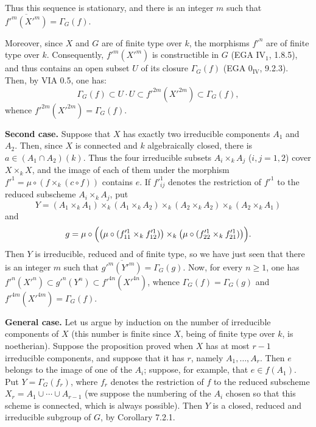 Thus this sequence is stationary, and there is an integer $m$ such that $\overline{f'^m(X'^m)}=\Gamma_G(f)$.

Moreover, since $X$ and $G$ are of finite type over $k$, the morphisms $f'^n$ are of finite type over $k$. Consequently, $f'^m(X'^m)$ is constructible in $G$ (EGA IV$_1$, 1.8.5), and thus contains an open subset $U$ of its closure $\Gamma_G(f)$ (EGA 0$_{\mathrm{IV}}$, 9.2.3). Then, by VIA 0.5, one has:
\[
\Gamma_G(f)\subset U\cdot U\subset f'^{2m}(X'^{2m})\subset\Gamma_G(f),
\]
whence $f'^{2m}(X'^{2m})=\Gamma_G(f)$.

\textbf{Second case.} Suppose that $X$ has exactly two irreducible components $A_1$ and $A_2$. Then, since $X$ is connected and $k$ algebraically closed, there is $a\in(A_1\cap A_2)(k)$. Thus the four irreducible subsets $A_i\times_k A_j$ ($i,j=1,2$) cover $X\times_k X$, and the image of each of them under the morphism $f'^1=\mu\circ(f\times_k(c\circ f))$ contains $e$. If $f'^1_{ij}$ denotes the restriction of $f'^1$ to the reduced subscheme $A_i\times_k A_j$, put
\[
Y=(A_1\times_k A_1)\times_k(A_1\times_k A_2)\times_k(A_2\times_k A_2)\times_k(A_2\times_k A_1)
\]
and
\[
g=\mu\circ\Bigl(\bigl(\mu\circ(f'^1_{11}\times_k f'^1_{12})\bigr)\times_k\bigl(\mu\circ(f'^1_{22}\times_k f'^1_{21})\bigr)\Bigr).
\]
Then $Y$ is irreducible, reduced and of finite type, so we have just seen that there is an integer $m$ such that $\overline{g'^m(Y'^m)}=\Gamma_G(g)$. Now, for every $n\geq1$, one has $f'^n(X'^n)\subset g'^n(Y^n)\subset f'^{4n}(X'^{4n})$, whence $\Gamma_G(f)=\Gamma_G(g)$ and $f'^{4m}(X'^{4m})=\Gamma_G(f)$.

\textbf{General case.} Let us argue by induction on the number of irreducible components of $X$ (this number is finite since $X$, being of finite type over $k$, is noetherian). Suppose the proposition proved when $X$ has at most $r-1$ irreducible components, and suppose that it has $r$, namely $A_1,\ldots,A_r$. Then $e$ belongs to the image of one of the $A_i$; suppose, for example, that $e\in f(A_1)$. Put $Y=\Gamma_G(f_r)$, where $f_r$ denotes the restriction of $f$ to the reduced subscheme $X_r=A_1\cup\cdots\cup A_{r-1}$ (we suppose the numbering of the $A_i$ chosen so that this scheme is connected, which is always possible). Then $Y$ is a closed, reduced and irreducible subgroup of $G$, by Corollary 7.2.1.

